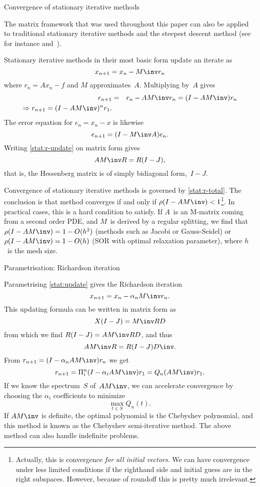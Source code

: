  {Convergence of stationary iterative methods}

The matrix framework that was used throughout this paper can also be
applied to traditional stationary iterative methods and the steepest
descent method (see for instance \cite{Va:book}
and~\cite{HaYo:applied}).

Stationary iterative methods in their most basic form update an
iterate as 
\begin{equation}
	x_{n+1}=x_n-M\inv r_n
	\label{stat:update}\end{equation}
where $r_n=Ax_n-f$ and
$M$ approximates~$A$. Multiplying by~$A$ gives
\begin{eqnarray} r_{n+1}&=&r_n-AM\inv r_n=(I-AM\inv)r_n
                \label{stat:r-update}\\
    \Rightarrow r_{n+1}=(I-AM\inv)^nr_1.
                \label{stat:r-total}
\end{eqnarray}
The error equation for $e_n=x_n-x$ is likewise
\[ e_{n+1}=(I-M\inv A)e_n. \]
Writing \eqref{stat:r-update} on matrix form gives
\[ AM\inv R=R(I-J), \]
that is, the Hessenberg matrix is of simply bidiagonal form,~$I-J$.

Convergence of stationary iterative methods is governed by
\eqref{stat:r-total}. The conclusion is that method converges if and
only if $\rho(I-AM\inv)<1$\footnote{Actually, this is convergence {\em
for all initial vectors}. We can have convergence under less limited
conditions if the righthand side and initial guess are in the right
subspaces. However, because of roundoff this is pretty much
irrelevant.}.
In practical cases, this is a hard
condition to satisfy. If $A$~is an M-matrix coming from a second order
PDE, and $M$~is derived by a regular splitting, we find that
$\rho(I-AM\inv)=1-O(h^2)$ (methods such as Jacobi or Gauss-Seidel) or
$\rho(I-AM\inv)=1-O(h)$ (SOR with optimal relaxation parameter), where
$h$~is the mesh size.

 {Parametrisation: Richardson iteration}
\label{sec:richardson}

Parametrising \eqref{stat:update} gives the Richardson iteration
\begin{equation} x_{n+1}=x_n-\alpha_nM\inv r_n. 
    \label{eq:richardson}\end{equation}
This updating formula can be
written in matrix form as \[X(I-J)=M\inv RD\] from which we find
$R(I-J)=AM\inv RD$, and thus
\begin{equation}
	AM\inv R=R(I-J)D\inv.
	\label{eq:richardson-AR=RH}\end{equation}
From $r_{n+1}=(I-\alpha_n AM\inv)r_n$ we get
\[r_{n+1}=\Pi^n_i(I-\alpha_iAM\inv)r_1=Q_n(AM\inv)r_1.\]
If we know the spectrum~$S$ of~$AM\inv$, we can accelerate convergence by
choosing the $\alpha_i$ coefficients to minimize
\[ \max_{t\in S}Q_n(t). \]
If $AM\inv$ is definite, the optimal polynomial is the Chebyshev
polynomial, and this method is known as the Chebyshev semi-iterative
method.
The above method can also handle indefinite problems.

